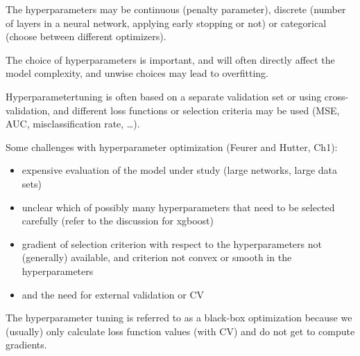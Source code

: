 \documentclass[
  ignorenonframetext,
]{beamer}
\providecommand{\tightlist}{%
  \setlength{\itemsep}{0pt}\setlength{\parskip}{0pt}}
\begin{document}
\begin{frame}

The hyperparameters may be continuous (penalty parameter), discrete
(number of layers in a neural network, applying early stopping or not)
or categorical (choose between different optimizers).

The choice of hyperparameters is important, and will often directly
affect the model complexity, and unwise choices may lead to overfitting.

Hyperparametertuning is often based on a separate validation set or
using cross-validation, and different loss functions or selection
criteria may be used (MSE, AUC, misclassification rate, \ldots).

\end{frame}

\begin{frame}

Some challenges with hyperparameter optimization (Feurer and Hutter,
Ch1):

\begin{itemize}
\tightlist
\item
  expensive evaluation of the model under study (large networks, large
  data sets)
\item
  unclear which of possibly many hyperparameters that need to be
  selected carefully (refer to the discussion for xgboost)
\item
  gradient of selection criterion with respect to the hyperparameters
  not (generally) available, and criterion not convex or smooth in the
  hyperparameters
\item
  and the need for external validation or CV
\end{itemize}

The hyperparameter tuning is referred to as a black-box optimization
because we (usually) only calculate loss function values (with CV) and
do not get to compute gradients.

\end{frame}
\end{document}
